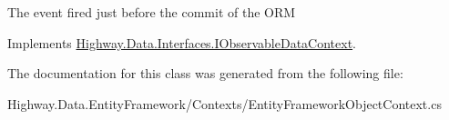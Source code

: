 The event fired just before the commit of the O\-R\-M 



Implements \hyperlink{interface_highway_1_1_data_1_1_interfaces_1_1_i_observable_data_context_add85ecbc05ebf7174003841bdbd72dfe}{Highway.\-Data.\-Interfaces.\-I\-Observable\-Data\-Context}.



The documentation for this class was generated from the following file\-:\begin{DoxyCompactItemize}
\item 
Highway.\-Data.\-Entity\-Framework/\-Contexts/Entity\-Framework\-Object\-Context.\-cs\end{DoxyCompactItemize}
